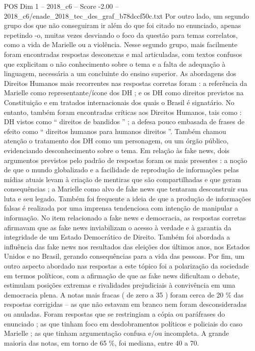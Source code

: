 \begin{textsample}{POS Dim 1 – 2018\_c6 – Score -2.00 – 2018\_c6/enade\_2018\_tec\_des\_graf\_b78dccf50c.txt}
Por outro lado, um segundo grupo dos que não conseguiram ir além do que foi citado no enunciado, apenas repetindo -o, muitas vezes desviando o foco da questão para temas correlatos, como a vida de Marielle ou a violência.
Nesse segundo grupo, mais facilmente foram encontradas respostas desconexas e mal articuladas, com textos confusos que explicitam o não conhecimento sobre o tema e a falta de adequação à linguagem, necessária a um concluinte do ensino superior.
As abordagens dos Direitos Humanos mais recorrentes nas respostas corretas foram : a referência da Marielle como representante/ícone dos DH ; e os DH como direitos previstos na Constituição e em tratados internacionais dos quais o Brasil é signatário.
No entanto, também foram encontradas críticas aos Direitos Humanos, tais como : DH vistos como “ direitos de bandidos ” ; a defesa pouco embasada de frases de efeito como “ direitos humanos para humanos direitos ”.
Também chamou atenção o tratamento dos DH como um personagem, ou um órgão público, evidenciando desconhecimento sobre o tema.
Em relação às fake news, dois argumentos previstos pelo padrão de respostas foram os mais presentes : a noção de que o mundo globalizado e a facilidade de reprodução de informações pelas mídias atuais levam à criação de mentiras que são compartilhadas e que geram consequências ; a Marielle como alvo de fake news que tentaram desconstruir sua luta e seu legado.
Também foi frequente a ideia de que a produção de informações falsas é realizada por uma imprensa tendenciosa com intenção de manipular a informação.
No item relacionado a fake news e democracia, as respostas corretas afirmavam que as fake news inviabilizam o acesso à verdade e à garantia da integridade de um Estado Democrático de Direito.
Também foi abordada a influência das fake news nos resultados das eleições dos últimos anos, nos Estados Unidos e no Brasil, gerando consequências para a vida das pessoas.
Por fim, um outro aspecto abordado nas respostas a este tópico foi a polarização da sociedade em termos políticos, com a afirmação de que as fake news dificultam o debate, estimulam posições extremas e rivalidades prejudiciais à convivência em uma democracia plena.
A notas mais fracas ( de zero a 35 ) foram cerca de 20 \% das respostas corrigidas – as que não estavam em branco nem foram desconsideradas ou anuladas.
Foram respostas que se restringiam a cópia ou paráfrases do enunciado ; as que tinham foco em desdobramentos políticos e policiais do caso Marielle ; as que tinham argumentação confusa e/ou incompleta.
A grande maioria das notas, em torno de 65 \%, foi mediana, entre 40 a 70.

\end{textsample}

